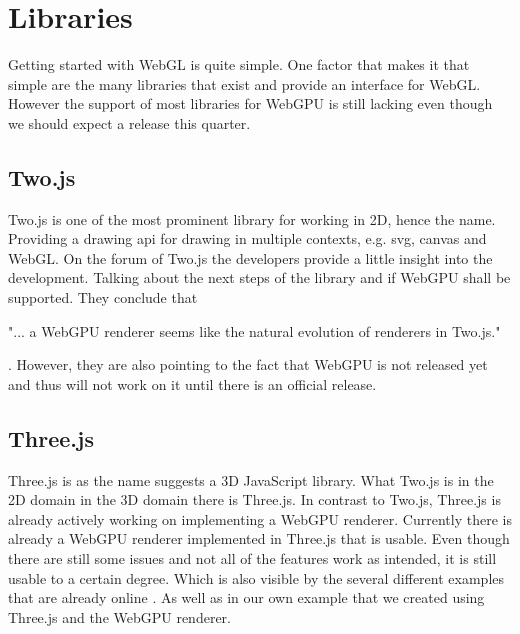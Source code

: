 %
%
%
%

\chapter{Libraries}

\label{chap:Libraries}

Getting started with WebGL is quite simple. One factor that makes it
that simple are the many libraries that exist and provide an interface
for WebGL. However the support of most libraries for WebGPU is still
lacking even though we should expect a release this quarter.

\section{Two.js}

Two.js is one of the most prominent library for working in 2D, hence the
name. Providing a drawing api for drawing in multiple contexts, e.g.
svg, canvas and WebGL. On the forum of Two.js the developers provide a
little insight into the development. Talking about the next steps of the
library and if WebGPU shall be supported. They conclude that
\begin{displayquote} "... a WebGPU renderer seems like the natural
evolution of renderers in Two.js."
\end{displayquote}\parencite{two_quote}.
However, they are also pointing to the fact that WebGPU is not released
yet and thus will not work on it until there is an official release.

\section{Three.js}

Three.js is as the name suggests a 3D JavaScript library. What Two.js is
in the 2D domain in the 3D domain there is Three.js.
In contrast to Two.js, Three.js is already actively working on
implementing a WebGPU renderer. Currently there is already a WebGPU
renderer implemented in Three.js that is usable. Even though there are
still some issues and not all of the features work as intended, it is
still usable to a certain degree. Which is also visible by the several
different examples that are already online \parencite{three_examples}.
As well as in our own example that we created using Three.js and the
WebGPU renderer. 


